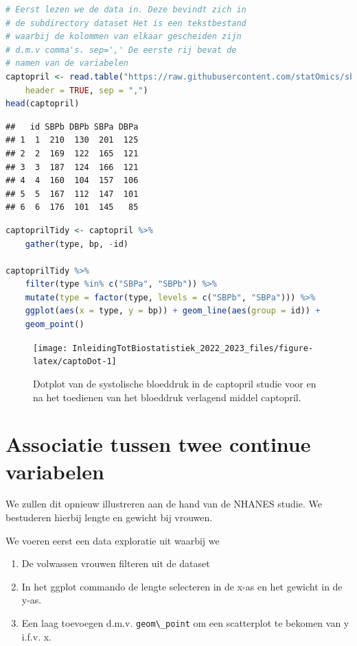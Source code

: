 \documentclass[
  12pt,dutch,coursenotes]{book}
\newcommand{\passthrough}[1]{#1}
\providecommand{\tightlist}{%
  \setlength{\itemsep}{0pt}\setlength{\parskip}{0pt}}
\begin{document}
\begin{lstlisting}[language=R]
# Eerst lezen we de data in. Deze bevindt zich in
# de subdirectory dataset Het is een tekstbestand
# waarbij de kolommen van elkaar gescheiden zijn
# d.m.v comma's. sep=',' De eerste rij bevat de
# namen van de variabelen
captopril <- read.table("https://raw.githubusercontent.com/statOmics/sbc21/master/data/captopril.txt",
    header = TRUE, sep = ",")
head(captopril)
\end{lstlisting}

\begin{lstlisting}
##   id SBPb DBPb SBPa DBPa
## 1  1  210  130  201  125
## 2  2  169  122  165  121
## 3  3  187  124  166  121
## 4  4  160  104  157  106
## 5  5  167  112  147  101
## 6  6  176  101  145   85
\end{lstlisting}

\begin{lstlisting}[language=R]
captoprilTidy <- captopril %>%
    gather(type, bp, -id)

captoprilTidy %>%
    filter(type %in% c("SBPa", "SBPb")) %>%
    mutate(type = factor(type, levels = c("SBPb", "SBPa"))) %>%
    ggplot(aes(x = type, y = bp)) + geom_line(aes(group = id)) +
    geom_point()
\end{lstlisting}

\begin{figure}

{\centering \texttt{[image: InleidingTotBiostatistiek\_2022\_2023\_files/figure-latex/captoDot-1]} 

}

\caption{Dotplot van de systolische bloeddruk in de captopril studie voor en na het toedienen van het bloeddruk verlagend middel captopril.}\label{fig:captoDot}
\end{figure}

\hypertarget{sec:correlatie}{%
\section{Associatie tussen twee continue variabelen}\label{sec:correlatie}}

We zullen dit opnieuw illustreren aan de hand van de NHANES studie. We bestuderen hierbij lengte en gewicht bij vrouwen.

We voeren eerst een data exploratie uit waarbij we

\begin{enumerate}
\def\labelenumi{\arabic{enumi}.}
\tightlist
\item
  De volwassen vrouwen filteren uit de dataset
\item
  In het ggplot commando de lengte selecteren in de x-as en het gewicht in de y-as.
\item
  Een laag toevoegen d.m.v. \passthrough{\lstinline!geom\_point!} om een scatterplot te bekomen van y i.f.v. x.
\end{enumerate}
\end{document}

